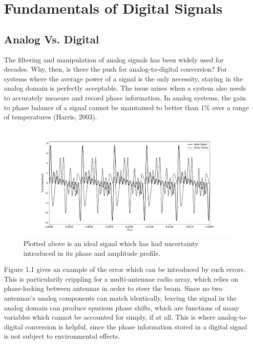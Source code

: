 \documentclass{report}
\begin{document}
\chapter{Fundamentals of Digital Signals}
\section{Analog Vs. Digital}

The filtering and manipulation of analog signals has been widely used for decades.  Why, then, is there the push for analog-to-digital conversion?  For systems where the average power of a signal is the only necessity, staying in the analog domain is perfectly acceptable.  The issue arises when a system also needs to accurately measure and record phase information.  In analog systems, the gain to phase balance of a signal cannot be maintained to better than $1\%$ over a range of temperatures (Harris, 2003).  

\begin{figure}[ht]
\includegraphics[scale=.45]{Figure_4.pdf}
\caption{Plotted above is an ideal signal which has had uncertainty introduced in its phase and amplitude profile.}
\end{figure}

Figure 1.1 gives an example of the error which can be introduced by such errors.  This is particularily crippling for a multi-antennae radio array, which relies on phase-locking between antennae in order to steer the beam.  Since no two antennae's analog components can match identically, leaving the signal in the analog domain can produce spurious phase shifts, which are functions of many variables which cannot be accounted for simply, if at all.  This is where analog-to-digital conversion is helpful, since the phase information stored in a digital signal is not subject to environmental effects.  
\end{document}
